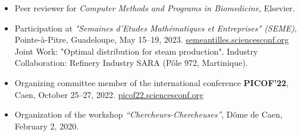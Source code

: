 \documentclass[10pt]{article} %
\begin{document}
\begin{itemize}
  \item Peer reviewer for \textit{Computer Methods and Programs in Biomedicine}, Elsevier.

  \item Participation at \textit{"Semaines d'Etudes Mathématiques et Entreprises" (SEME)},  
  Pointe-à-Pitre, Guadeloupe, May 15–19, 2023.  
  \href{https://semeantilles.sciencesconf.org/}{semeantilles.sciencesconf.org}  
  Joint Work: "Optimal distribution for steam production".
  Industry Collaboration: Refinery Industry SARA (Pôle 972, Martinique).

  \item Organizing committee member of the international conference \textbf{PICOF’22},  
  Caen, October 25–27, 2022.  
  \href{https://picof22.sciencesconf.org/}{picof22.sciencesconf.org}

  \item Organization of the workshop \textit{“Chercheurs-Chercheuses”},  
  Dôme de Caen, February 2, 2020.
\end{itemize}
\end{document}
